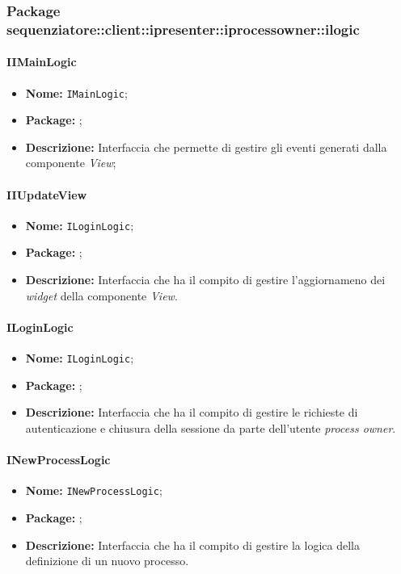 \subsubsection{Package sequenziatore::client::ipresenter::iprocessowner::ilogic}
\paragraph{IIMainLogic}
\begin{itemize}
\item \textbf{Nome:} \texttt{IMainLogic};
\item \textbf{Package:} \texttt{\iLogicAdmin{}};
\item \textbf{Descrizione:} Interfaccia che permette di gestire gli eventi generati dalla componente \textit{View};
\end{itemize}

\paragraph{IIUpdateView}
\begin{itemize}
\item \textbf{Nome:} \texttt{ILoginLogic};
\item \textbf{Package:} \texttt{\iLogicAdmin{}};
\item \textbf{Descrizione:} Interfaccia che ha il compito di gestire l'aggiornameno dei \textit{widget} della componente \textit{View}.
\end{itemize}

\paragraph{ILoginLogic}
\begin{itemize}
\item \textbf{Nome:} \texttt{ILoginLogic};
\item \textbf{Package:} \texttt{\iLogicAdmin{}};
\item \textbf{Descrizione:} Interfaccia che ha il compito di gestire le richieste di autenticazione e chiusura della sessione da parte dell'utente \textit{process owner}.
\end{itemize}

\paragraph{INewProcessLogic}
\begin{itemize}
\item \textbf{Nome:} \texttt{INewProcessLogic};
\item \textbf{Package:} \texttt{\iLogicAdmin{}};
\item \textbf{Descrizione:} Interfaccia che ha il compito di gestire la logica della definizione di un nuovo processo.
\end{itemize}



